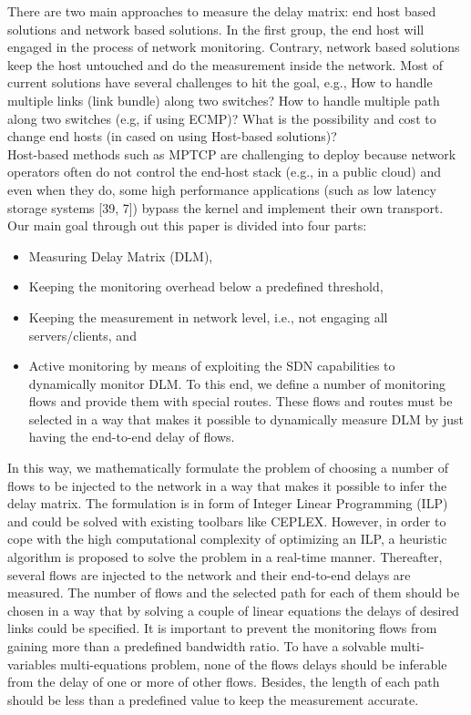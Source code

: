 \documentclass[10pt, journal, letterpaper]{IEEEtran}
\begin{document}
There are two main approaches to measure the delay matrix: end host based solutions and network based solutions. In the first group, the end host will engaged in the process of network monitoring. Contrary, network based solutions keep the host untouched and do the measurement inside the network. Most of current solutions have several challenges to hit the goal, e.g., How to handle multiple links (link bundle) along two switches? How to handle multiple path along two switches (e.g, if using ECMP)? What is the possibility and cost to change end hosts (in cased on using Host-based solutions)?\\
Host-based methods such as MPTCP are challenging to deploy because network operators often do not control the end-host stack (e.g., in a public cloud) and even when they do, some high performance applications (such as low latency storage systems [39, 7]) bypass the kernel and implement their own transport. Our main goal through out this paper is divided into four parts: 
\begin{itemize}
\item Measuring Delay Matrix (DLM), 
\item Keeping the monitoring overhead below a predefined threshold, 
\item Keeping the measurement in network level, i.e., not engaging all servers/clients, and 
\item Active monitoring by means of exploiting the SDN capabilities to dynamically monitor DLM. To this end, we define a number of monitoring flows and provide them with special routes. These flows and routes must be selected in a way that makes it possible to dynamically measure DLM by just having the end-to-end delay of flows. 
\end{itemize}
In this way, we mathematically formulate the problem of choosing a number of flows to be injected to the network in a way that makes it possible to infer the delay matrix. The formulation is in form of Integer Linear Programming (ILP) and could be solved with existing toolbars like CEPLEX. However, in order to cope with the high computational complexity of optimizing an ILP, a heuristic algorithm is proposed to solve the problem in a real-time manner. Thereafter, several flows are injected to the network and their end-to-end delays are measured. The number of flows and the selected path for each of them should be chosen in a way that by solving a couple of linear equations the delays of desired links could be specified. It is important to prevent the monitoring flows from gaining more than a predefined bandwidth ratio. To have a solvable multi-variables multi-equations problem, none of the flows delays should be inferable from the delay of one or more of other flows. Besides, the length of each path should be less than a predefined value to keep the measurement accurate.
\end{document}
